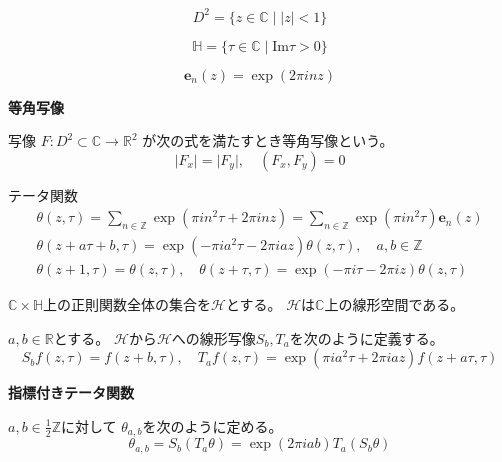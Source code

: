 \documentclass[12pt,b5paper]{ltjsarticle}
\begin{document}
\hrulefill

\begin{equation}
 D^{2} = \{z\in\mathbb{C} \mid \lvert z \rvert <1\}
\end{equation}

\begin{equation}
 \mathbb{H} = \{ \tau \in \mathbb{C} \mid \mathrm{Im}\tau > 0 \}
\end{equation}

\begin{equation}
 \mathbf{e}_{n}(z) = \exp{(2\pi i n z)}
\end{equation}

\hrulefill

\textbf{等角写像}

写像
$F:D^{2} \subset \mathbb{C} \to\mathbb{R}^{2}$
が次の式を満たすとき等角写像という。
\begin{equation}
 \lvert F_{x} \rvert
= \lvert F_{y} \rvert
,\quad
(F_{x},F_{y})=0
\end{equation}

\hrulefill

テータ関数
\begin{gather}
 \theta(z,\tau)
  = \sum_{n\in\mathbb{Z}} \exp{(\pi i n^{2} \tau + 2\pi inz)}
  = \sum_{n\in\mathbb{Z}} \exp{(\pi i n^{2} \tau)} \mathbf{e}_{n}(z)
 \\
 \theta(z+a\tau+b,\tau)
 = \exp{(-\pi ia^{2}\tau-2\pi iaz)\theta(z,\tau)}
 ,\quad a,b\in\mathbb{Z}
 \\
 \theta(z+1,\tau)=\theta(z,\tau)
 ,\quad
 \theta(z+\tau,\tau)=\exp{(-\pi i\tau-2\pi iz)\theta(z,\tau)}
\end{gather}

\hrulefill

$\mathbb{C}\times \mathbb{H}$上の正則関数全体の集合を$\mathcal{H}$とする。
$\mathcal{H}$は$\mathbb{C}$上の線形空間である。

$a,b\in\mathbb{R}$とする。
$\mathcal{H}$から$\mathcal{H}$への線形写像$S_{b},T_{a}$を次のように定義する。
\begin{equation}
 S_{b}f(z,\tau) = f(z+b,\tau)
  ,\quad
 T_{a}f(z,\tau)
 = \exp{(\pi ia^{2}\tau + 2\pi i az)} f(z+a\tau,\tau)
\end{equation}

\hrulefill

\textbf{指標付きテータ関数}

$a,b\in \frac{1}{2}\mathbb{Z}$に対して
$\theta_{a,b}$を次のように定める。
\begin{equation}
 \theta_{a,b}
  = S_{b}(T_{a}\theta)
  = \exp{(2\pi i ab)} T_{a}(S_{b}\theta)
\end{equation}
\end{document}
